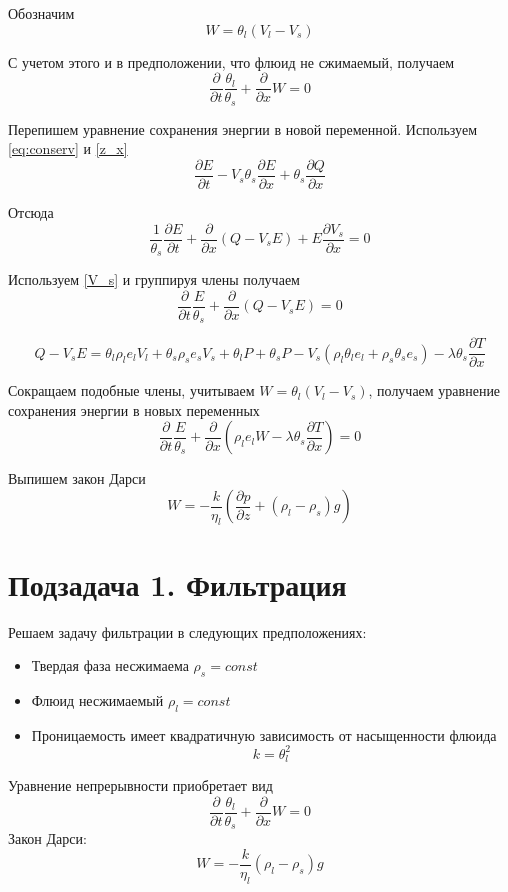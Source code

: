 \documentclass[12pt]{article}
\newcommand{\pd}[2]{\frac{\partial #1}{\partial #2}}
\begin{document}
Обозначим 
\begin{equation}
W = \theta_l (V_l - V_s )
\label{W_filtr}
\end{equation}

С учетом этого и в предположении, что флюид не сжимаемый, получаем
\begin{equation}
\pd{}{t}\frac{\theta_l}{\theta_s} + \pd{}{x}W = 0
\label{filtr_compr}
\end{equation}

Перепишем уравнение сохранения энергии в новой переменной. Используем \eqref{eq:conserv} и \eqref{z_x}
$$
\pd{E}{t} - V_s\theta_s\pd{E}{x} + \theta_s\pd{Q}{x}
$$

Отсюда
$$
\frac{1}{\theta_s}\pd{E}{t} + \pd{}{x}(Q-V_s E) + E\pd{V_s}{x} = 0
$$

Используем \eqref{V_s} и группируя члены получаем
\begin{equation}
\pd{}{t}\frac{E}{\theta_s} + \pd{}{x}(Q - V_s E) = 0
\end{equation}

$$
Q-V_s E = \theta_l\rho_l e_l V_l + \theta_s\rho_s e_s V_s + \theta_l P + \theta_s P -V_s(\rho_l\theta_l e_l +\rho_s\theta_s e_s) - \lambda\theta_s\pd{T}{x}
$$

Сокращаем подобные члены, учитываем $W = \theta_l (V_l - V_s )$, получаем уравнение сохранения энергии в новых переменных
\begin{equation}
\pd{}{t}\frac{E}{\theta_s} + \pd{}{x}(\rho_l e_l W - \lambda\theta_s\pd{T}{x}) = 0
\label{eq:conserv_new}
\end{equation}

Выпишем закон Дарси
\begin{equation}
W= -\frac{k}{\eta_l}\left(\pd{p}{z} + (\rho_l-\rho_s)g \right)
\label{Darsi}
\end{equation}
\newpage
\section*{Подзадача 1. Фильтрация}

Решаем задачу фильтрации в следующих предположениях:
\begin{itemize}
\item Твердая фаза несжимаема $\rho_s = const $
\item Флюид несжимаемый $\rho_l = const $
\item Проницаемость имеет квадратичную зависимость от насыщенности флюида
\begin{equation}
k=\theta_l^2
\label{perm}
\end{equation}
\end{itemize}
Уравнение непрерывности приобретает вид
$$
\pd{}{t}\frac{\theta_l}{\theta_s} + \pd{}{x}W = 0
$$
Закон Дарси:
$$
W= -\frac{k}{\eta_l}(\rho_l-\rho_s)g
$$
\end{document}
